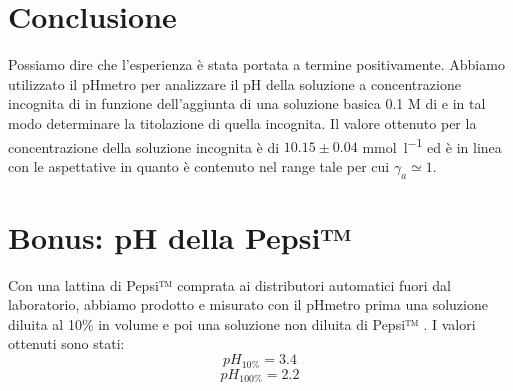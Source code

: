 \section*{Conclusione}

Possiamo dire che l'esperienza è stata portata a termine positivamente.
Abbiamo utilizzato il pHmetro per analizzare il pH della soluzione a concentrazione incognita di  in funzione dell'aggiunta di una soluzione basica 0.1 M di  e in tal modo determinare la titolazione di quella incognita.
Il valore ottenuto per la concentrazione della soluzione incognita è di $10.15 \pm 0.04$ \si{\milli\mol\per\litre} ed è in linea con le aspettative in quanto è contenuto nel range tale per cui $\gamma_{a} \simeq 1$.

\section*{Bonus: pH della Pepsi™}

Con una lattina di Pepsi™ comprata ai distributori automatici fuori dal laboratorio, abbiamo prodotto e misurato con il pHmetro prima una soluzione diluita al 10\% in volume e poi una soluzione non diluita di Pepsi™ .
I valori ottenuti sono stati:
$$pH_{10\%} = 3.4$$
$$pH_{100\%} = 2.2$$
